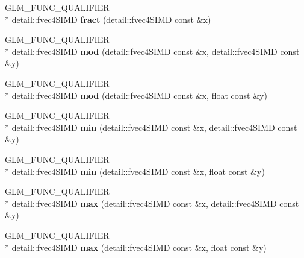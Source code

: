 \begin{DoxyCompactItemize}
\item 
\hypertarget{namespaceglm_a5a003d7f27903c03744ca6271f1a9051}{G\-L\-M\-\_\-\-F\-U\-N\-C\-\_\-\-Q\-U\-A\-L\-I\-F\-I\-E\-R \\*
detail\-::fvec4\-S\-I\-M\-D {\bfseries fract} (detail\-::fvec4\-S\-I\-M\-D const \&x)}\label{namespaceglm_a5a003d7f27903c03744ca6271f1a9051}

\item 
\hypertarget{namespaceglm_a560289b95e600d6da427ad473c1f46cf}{G\-L\-M\-\_\-\-F\-U\-N\-C\-\_\-\-Q\-U\-A\-L\-I\-F\-I\-E\-R \\*
detail\-::fvec4\-S\-I\-M\-D {\bfseries mod} (detail\-::fvec4\-S\-I\-M\-D const \&x, detail\-::fvec4\-S\-I\-M\-D const \&y)}\label{namespaceglm_a560289b95e600d6da427ad473c1f46cf}

\item 
\hypertarget{namespaceglm_a66a9b0ed141fd219673b9adf8e400ec0}{G\-L\-M\-\_\-\-F\-U\-N\-C\-\_\-\-Q\-U\-A\-L\-I\-F\-I\-E\-R \\*
detail\-::fvec4\-S\-I\-M\-D {\bfseries mod} (detail\-::fvec4\-S\-I\-M\-D const \&x, float const \&y)}\label{namespaceglm_a66a9b0ed141fd219673b9adf8e400ec0}

\item 
\hypertarget{namespaceglm_af6ef9739a4145dc0004408132eff235b}{G\-L\-M\-\_\-\-F\-U\-N\-C\-\_\-\-Q\-U\-A\-L\-I\-F\-I\-E\-R \\*
detail\-::fvec4\-S\-I\-M\-D {\bfseries min} (detail\-::fvec4\-S\-I\-M\-D const \&x, detail\-::fvec4\-S\-I\-M\-D const \&y)}\label{namespaceglm_af6ef9739a4145dc0004408132eff235b}

\item 
\hypertarget{namespaceglm_ace53be5aa101f55503d1fd863ac97de3}{G\-L\-M\-\_\-\-F\-U\-N\-C\-\_\-\-Q\-U\-A\-L\-I\-F\-I\-E\-R \\*
detail\-::fvec4\-S\-I\-M\-D {\bfseries min} (detail\-::fvec4\-S\-I\-M\-D const \&x, float const \&y)}\label{namespaceglm_ace53be5aa101f55503d1fd863ac97de3}

\item 
\hypertarget{namespaceglm_a8003e838df57188edaa8b8fe512516a6}{G\-L\-M\-\_\-\-F\-U\-N\-C\-\_\-\-Q\-U\-A\-L\-I\-F\-I\-E\-R \\*
detail\-::fvec4\-S\-I\-M\-D {\bfseries max} (detail\-::fvec4\-S\-I\-M\-D const \&x, detail\-::fvec4\-S\-I\-M\-D const \&y)}\label{namespaceglm_a8003e838df57188edaa8b8fe512516a6}

\item 
\hypertarget{namespaceglm_a6a8611ddc96e204e7669872c6a68b972}{G\-L\-M\-\_\-\-F\-U\-N\-C\-\_\-\-Q\-U\-A\-L\-I\-F\-I\-E\-R \\*
detail\-::fvec4\-S\-I\-M\-D {\bfseries max} (detail\-::fvec4\-S\-I\-M\-D const \&x, float const \&y)}\label{namespaceglm_a6a8611ddc96e204e7669872c6a68b972}


\end{DoxyCompactItemize}
